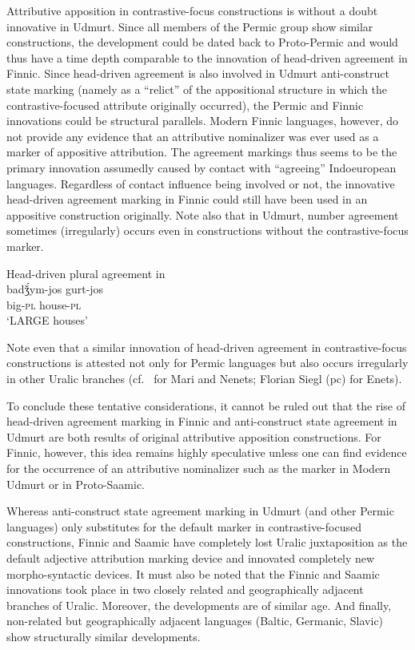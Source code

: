 {Attributive apposition in contrastive-focus constructions is without a doubt innovative in Udmurt. Since all members of the Permic group show similar constructions, the development could be dated back to Proto-Permic and would thus have a time depth comparable to the innovation of head-driven agreement in Finnic. Since head-driven agreement is also involved in Udmurt anti-construct state marking (namely as a “relict” of the appositional structure in which the contrastive-focused attribute originally occurred), the Permic and Finnic innovations could be structural parallels. Modern Finnic languages, however, do not provide any evidence that an attributive nominalizer was ever used as a marker of appositive attribution. The agreement markings thus seems to be the primary innovation assumedly caused by contact with “agreeing” Indoeuropean languages. Regardless of contact influence being involved or not, the innovative head-driven agreement marking in Finnic could still have been used in an appositive construction originally. Note also that in Udmurt, number agreement sometimes (irregularly) occurs even in constructions without the contrastive-focus marker.
\begin{exe}
\ex Head-driven plural agreement in \\
\gll	badǯ́ym-jos gurt-jos\\
	big-\textsc{pl} house-\textsc{pl}\\
\glt	‘LARGE houses’
\end{exe}
Note even that a similar innovation of head-driven agreement in contrastive-focus constructions is attested not only for Permic languages but also occurs irregularly in other Uralic branches (cf.~\citealt[136–138, 142]{honti1997} for Mari and Nenets; Florian Siegl (pc) for Enets).

To conclude these tentative considerations, it cannot be ruled out that the rise of head-driven agreement marking in Finnic and anti-construct state agreement in Udmurt are both results of original attributive apposition constructions. For Finnic, however, this idea remains highly speculative unless one can find evidence for the occurrence of an attributive nominalizer such as the marker in Modern Udmurt or in Proto-Saamic. 

Whereas anti-construct state agreement marking in Udmurt (and other Permic languages) only substitutes for the default marker in contrastive-focused constructions, Finnic and Saamic have completely lost Uralic juxtaposition as the default adjective attribution marking device and innovated completely new morpho-syntactic devices. It must also be noted that the Finnic and Saamic innovations took place in two closely related and geographically adjacent branches of Uralic. Moreover, the developments are of similar age. And finally, non-related but geographically adjacent languages (Baltic, Germanic, Slavic) show structurally similar developments.

}
